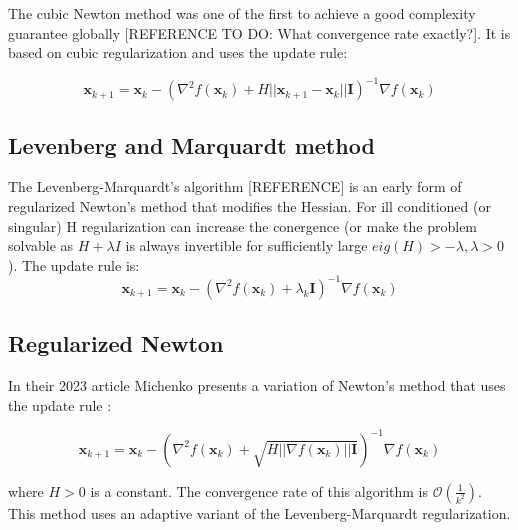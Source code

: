 \documentclass{article}
\begin{document}
The cubic Newton method was one of the first to achieve a good complexity guarantee globally [REFERENCE TO DO: What convergence rate exactly?]. It is based on cubic regularization and uses the update rule:

\begin{equation}
\mathbf{x}_{k+1} = \mathbf{x}_{k} - ( \nabla^2 f(\mathbf{x}_k) + H ||\mathbf{x}_{k+1} - \mathbf{x}_{k}||\mathbf{I})^{-1} \nabla f(\mathbf{x}_k)
\end{equation}

\subsection{Levenberg and Marquardt method}

The Levenberg-Marquardt's algorithm [REFERENCE] is an early form of regularized Newton's method that modifies the Hessian. For ill conditioned (or singular) H regularization can increase the conergence (or make the problem solvable as $H + \lambda I$ is always invertible for sufficiently large $eig(H)> - \lambda, \lambda > 0$). The update rule is:
\begin{equation}
\mathbf{x}_{k+1} = \mathbf{x}_{k} - ( \nabla^2 f(\mathbf{x}_k) + \lambda_k \mathbf{I})^{-1} \nabla f(\mathbf{x}_k)
\end{equation}

\subsection{Regularized Newton}

In their 2023 article Michenko presents a variation of Newton's method that uses the update rule \cite{mishchenko2023regularized}:

\begin{equation}
\mathbf{x}_{k+1} = \mathbf{x}_{k} - ( \nabla^2 f(\mathbf{x}_k) + \sqrt{ H ||\nabla f(\mathbf{x}_k)||\mathbf{I}})^{-1} \nabla f(\mathbf{x}_k)
  \label{eq:regularized-newton}
\end{equation}

where $H > 0$ is a constant. The convergence rate of this algorithm is $\mathcal{O}(\frac{1}{k^2})$. This method uses an adaptive variant of the Levenberg-Marquardt regularization. 
\end{document}
